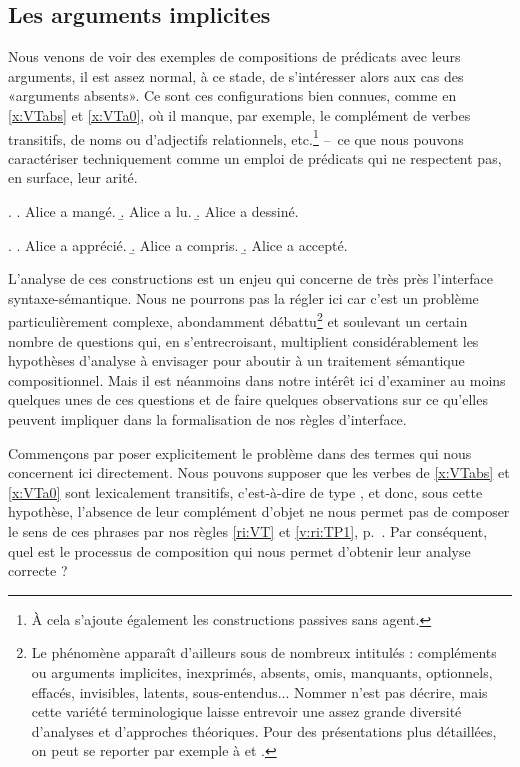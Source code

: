 \subsection{Les arguments implicites}
\label{ss:ArgImpl}
Nous venons de voir des exemples de compositions de prédicats avec leurs arguments, il est assez normal, à ce stade, de s'intéresser alors aux cas des «arguments absents».  Ce sont ces configurations bien connues, comme en \ref{x:VTabs} et \ref{x:VTa0}, où il manque, par exemple, le complément de verbes transitifs,  de noms ou d'adjectifs relationnels, etc.\footnote{À cela s'ajoute également les constructions passives sans agent.} --~ce que nous pouvons caractériser techniquement comme un emploi de prédicats qui ne respectent pas, en surface, leur arité.


\ex.  \label{x:VTabs}
\a. Alice a mangé. \label{x:VTabsa}
\b. Alice a lu. \label{x:VTabsb}
\b. Alice a dessiné. \label{x:VTabsc}

\ex. \label{x:VTa0}
\a. Alice a apprécié. \label{x:VTa0a}
\b. Alice a compris. \label{x:VTa0b}
\b. Alice a accepté. \label{x:VTa0c}


\sloppy
L'analyse de ces constructions est un enjeu qui concerne de très près l'interface syntaxe-sémantique.  Nous ne pourrons pas la régler ici car c'est un problème particulièrement complexe, abondamment débattu\footnote{Le phénomène apparaît d'ailleurs sous de nombreux intitulés : compléments ou arguments implicites, inexprimés, absents, omis, manquants, optionnels, effacés, invisibles, latents, sous-entendus... Nommer n'est pas décrire, mais cette variété terminologique laisse entrevoir une assez grande diversité d'analyses et d'approches théoriques. Pour des présentations plus détaillées, on peut se reporter par exemple à \citet{Gillon:12} et \citet{Bourmayan:13}.} et soulevant un certain nombre de questions qui, en s'entrecroisant,  multiplient considérablement les hypothèses d'analyse à envisager pour aboutir à un traitement sémantique compositionnel.  
Mais il est néanmoins dans notre intérêt ici d'examiner au moins quelques unes de ces questions et de faire quelques observations sur ce qu'elles peuvent impliquer dans la formalisation de nos règles d'interface.


Commençons par poser explicitement le problème dans des termes qui nous concernent ici directement.  Nous pouvons supposer que les verbes de \ref{x:VTabs} et \ref{x:VTa0} sont lexicalement transitifs, c'est-à-dire de type \eet, et donc, sous cette hypothèse, l'absence de leur complément d'objet ne nous permet pas de composer le sens de ces phrases par nos règles \ref{ri:VT} et \ref{v:ri:TP1}, p.~\pageref{ri:VT}. 
Par conséquent, quel est le processus de composition qui nous permet d'obtenir leur analyse correcte ?

